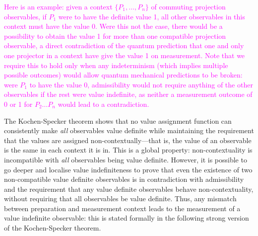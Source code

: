 \documentclass[%
 superscriptaddress,
 preprint,
 showpacs,
 showkeys,
 preprintnumbers,
  amsmath,amssymb,
  aps,
 pra,
  longbibliography,
  floatfix,
 ]{revtex4-1}
\theoremstyle{definition}
\begin{document}
\textcolor{magenta}{
Here is an example: given a context $\{P_1,\dots,P_n\}$ of commuting projection observables, if $P_1$ were to have the definite value 1, all other observables in this context must have the value 0.
Were this not the case, there would be a possibility to obtain the value 1 for more than one compatible projection observable, a direct contradiction of the quantum prediction that one and only one projector in a context have give the value 1 on measurement.
Note that we require this to hold only when any indeterminism (which implies multiple possible outcomes) would allow quantum mechanical predictions to be broken:
were $P_1$ to have the value 0, admissibility would not require anything of the other observables if the rest were value indefinite, as neither a measurement outcome of 0 or 1 for $P_2\dots P_n$ would lead to a contradiction.
}

The Kochen-Specker theorem \cite{kochen1} shows that no value assignment function can consistently make \emph{all} observables value definite while maintaining the requirement that the values are assigned non-contextually---that is, the value of an observable is the same in each context it is in.
This is a global property: non-contextuality is incompatible with \emph{all} observables being value definite.
However, it is possible to go deeper and localise value indefiniteness to prove that even the existence of two non-compatible value definite observables is in contradiction with admissibility and the requirement that any value definite observables behave non-contextuality, without requiring that all observables be value definite.
Thus, any mismatch between preparation and measurement context leads to the measurement of a value indefinite observable: this is stated formally in the following strong version of the Kochen-Specker theorem.



\end{document}
